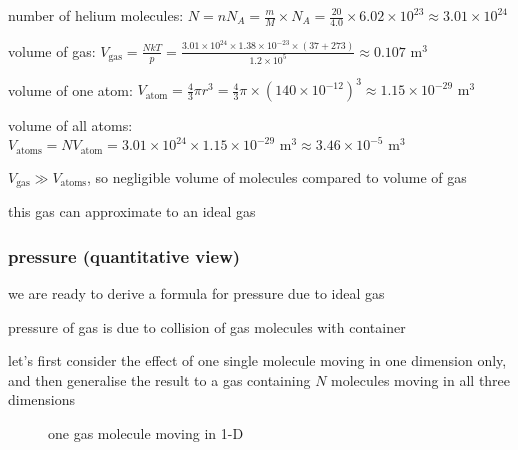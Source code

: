 \sol number of helium molecules: $N = nN_A = \frac{m}{M} \times N_A = \frac{20}{4.0} \times 6.02\times10^{23} \approx 3.01\times10^{24} $

\eqyskip

volume of gas: $V_\text{gas} = \frac{NkT}{p} = \frac{3.01\times10^{24}\times1.38\times10^{-23}\times (37+273)}{1.2\times10^5} \approx 0.107 \text{ m}^3$

\eqyskip

volume of one atom: $V_\text{atom} = \frac{4}{3}\pi r^3 = \frac{4}{3} \pi\times(140\times10^{-12})^3 \approx 1.15\times10^{-29} \text{ m}^3$

volume of all atoms: $V_\text{atoms} = N V_\text{atom} = 3.01\times10^{24} \times 1.15\times10^{-29} \text{ m}^3 \approx 3.46 \times 10^{-5} \text{ m}^{3}$

$V_\text{gas} \gg V_\text{atoms}$, so negligible volume of molecules compared to volume of gas

this gas can approximate to an ideal gas \eoe


\subsubsection{pressure (quantitative view)}

we are ready to derive a formula for pressure due to ideal gas

pressure of gas is due to collision of gas molecules with container

let's first consider the effect of one single molecule moving in one dimension only, and then generalise the result to a gas containing $N$ molecules moving in all three dimensions



\begin{figure}[ht]
\centering
{}

one gas molecule moving in 1-D
\end{figure}

